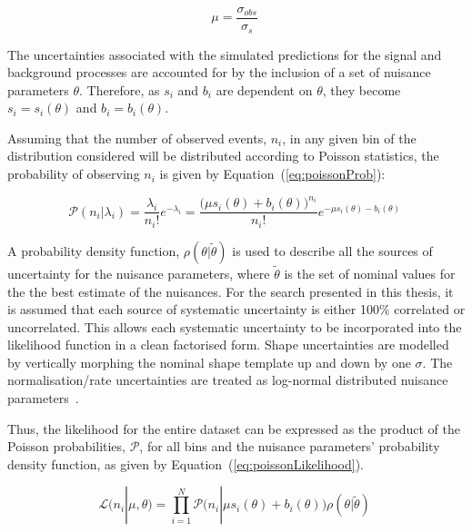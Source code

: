 \begin{equation}
\mu = \frac{\sigma_{obs}}{\sigma_{s}}  \;
\label{eq:signalModifier}
\end{equation}
 
The uncertainties associated with the simulated predictions for the signal and background processes are accounted for by the inclusion of a set of nuisance parameters $\theta$.
Therefore, as $s_{i}$ and $b_{i}$ are dependent on $\theta$, they become $s_{i} = s_{i} (\theta)$ and $b_{i} = b_{i} (\theta)$.

Assuming that the number of observed events, $n_{i}$, in any given bin of the distribution considered will be distributed according to Poisson statistics, the probability of observing $n_{i}$ is given by Equation~(\ref{eq:poissonProb}):

\begin{equation}
\mathcal{P} ( n_{i} | \lambda_{i} ) = \frac{\lambda_{i}}{n_{i}!} e^{- \lambda_{i}} = \frac{ \big( \mu s_{i}(\theta) + b_{i}(\theta) \big)^{n_{i}}}{n_{i} !} e^{- \mu s_{i}(\theta) - b_{i}(\theta)}  \;
\label{eq:poissonProb}
\end{equation}

A probability density function, $\rho ( \theta | \tilde{\theta} )$ is used to describe all the sources of uncertainty for the nuisance parameters, where $\tilde{\theta}$ is the set of nominal values for the the best estimate of the nuisances.
For the search presented in this thesis, it is assumed that each source of systematic uncertainty is either 100\% correlated or uncorrelated.
This allows each systematic uncertainty to be incorporated into the likelihood function in a clean factorised form.
Shape uncertainties are modelled by vertically morphing the nominal shape template up and down by one $\sigma$.
The normalisation/rate uncertainties are treated as log-normal distributed nuisance parameters~\cite{Baak:2014fta,AsymptoticFormulae}.

Thus, the likelihood for the entire dataset can be expressed as the product of the Poisson probabilities, $\mathcal{P}$, for all bins and the nuisance parameters' probability density function, as given by Equation~(\ref{eq:poissonLikelihood}).

\begin{equation}
\mathcal{L} ( n_{i} | \mu , \theta ) = 
\prod_{i=1}^{N} \mathcal{P} \big( n_{i} | \mu s_{i}(\theta) + b_{i}(\theta) \big) \rho ( \theta | \tilde{\theta} ) \;
\label{eq:poissonLikelihood}
\end{equation}

